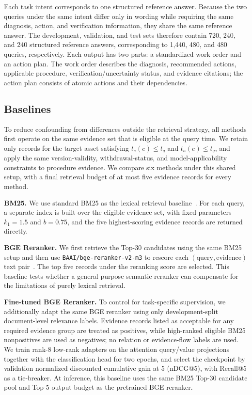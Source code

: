 Each task intent corresponds to one structured reference answer. Because the two queries under the same intent differ only in wording while requiring the same diagnosis, action, and verification information, they share the same reference answer. The development, validation, and test sets therefore contain 720, 240, and 240 structured reference answers, corresponding to 1,440, 480, and 480 queries, respectively. Each output has two parts: a standardized work order and an action plan. The work order describes the diagnosis, recommended actions, applicable procedure, verification/uncertainty status, and evidence citations; the action plan consists of atomic actions and their dependencies.

\subsection{Baselines}
\label{sec:baselines}

To reduce confounding from differences outside the retrieval strategy, all methods first operate on the same evidence set that is eligible at the query time. We retain only records for the target asset satisfying
$t_e(e)\le t_q$ and $t_a(e)\le t_q$, and apply the same version-validity, withdrawal-status, and model-applicability constraints to procedure evidence. We compare six methods under this shared setup, with a final retrieval budget of at most five evidence records for every method.

\textbf{BM25.}
We use standard BM25 as the lexical retrieval baseline~\cite{robertson2009bm25}. For each query, a separate index is built over the eligible evidence set, with fixed parameters $k_1=1.5$ and $b=0.75$, and the five highest-scoring evidence records are returned directly.

\textbf{BGE Reranker.}
We first retrieve the Top-30 candidates using the same BM25 setup and then use \texttt{BAAI/bge-reranker-v2-m3} to rescore each $(\text{query},\text{evidence})$ text pair~\cite{chen2024bgem3,flagembedding2026reranker}. The top five records under the reranking score are selected. This baseline tests whether a general-purpose semantic reranker can compensate for the limitations of purely lexical retrieval.

\textbf{Fine-tuned BGE Reranker.}
To control for task-specific supervision, we additionally adapt the same BGE reranker using only development-split document-level relevance labels. Evidence records listed as acceptable for any required evidence group are treated as positives, while high-ranked eligible BM25 nonpositives are used as negatives; no relation or evidence-flow labels are used. We train rank-8 low-rank adapters on the attention query/value projections together with the classification head for two epochs, and select the checkpoint by validation normalized discounted cumulative gain at 5 (nDCG@5), with Recall@5 as a tie-breaker. At inference, this baseline uses the same BM25 Top-30 candidate pool and Top-5 output budget as the pretrained BGE reranker.

